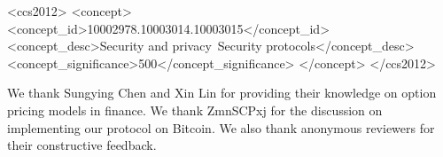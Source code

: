 \documentclass[sigconf, natbib=false]{acmart}
\renewcommand\_{\textunderscore\allowbreak}
\begin{document}
\begin{CCSXML}
<ccs2012>
<concept>
<concept_id>10002978.10003014.10003015</concept_id>
<concept_desc>Security and privacy~Security protocols</concept_desc>
<concept_significance>500</concept_significance>
</concept>
</ccs2012>
\end{CCSXML}


\maketitle













\begin{acks}
We thank Sungying Chen and Xin Lin for providing their knowledge on option pricing models in finance.
We thank ZmnSCPxj for the discussion on implementing our protocol on Bitcoin.
We also thank anonymous reviewers for their constructive feedback.
\end{acks}

\printbibliography


\end{document}
